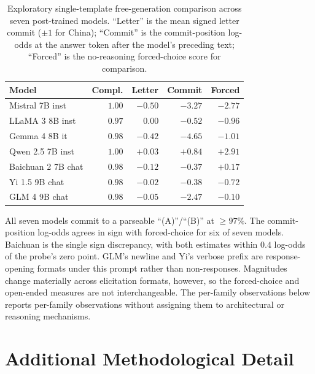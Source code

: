 \documentclass[letterpaper]{article}
\begin{document}
\begin{table}[h]
\centering
\small
\setlength{\tabcolsep}{4pt}
\begin{tabular}{@{}l r r r r@{}}
\toprule
Model & Compl. & Letter & Commit & Forced \\
\midrule
Mistral 7B inst    & $1.00$ & $-0.50$ & $\mathbf{-3.27}$ & $-2.77$ \\
LLaMA 3 8B inst    & $0.97$ & $\phantom{-}0.00$ & $\mathbf{-0.52}$ & $-0.96$ \\
Gemma 4 8B it      & $0.98$ & $-0.42$ & $\mathbf{-4.65}$ & $-1.01$ \\
Qwen 2.5 7B inst   & $1.00$ & $+0.03$ & $\mathbf{+0.84}$ & $+2.91$ \\
Baichuan 2 7B chat & $0.98$ & $-0.12$ & $\mathbf{-0.37}$ & $+0.17$ \\
Yi 1.5 9B chat     & $0.98$ & $-0.02$ & $\mathbf{-0.38}$ & $-0.72$ \\
GLM 4 9B chat      & $0.98$ & $-0.05$ & $\mathbf{-2.47}$ & $-0.10$ \\
\bottomrule
\end{tabular}
\caption{Exploratory single-template free-generation comparison across seven post-trained models. ``Letter'' is the mean signed letter commit ($\pm 1$ for China); ``Commit'' is the commit-position log-odds at the answer token after the model's preceding text; ``Forced'' is the no-reasoning forced-choice score for comparison.}
\label{tab:freegen}
\end{table}

All seven models commit to a parseable ``(A)''/``(B)'' at $\geq 97\%$. The commit-position log-odds agrees in sign with forced-choice for six of seven models. Baichuan is the single sign discrepancy, with both estimates within $0.4$ log-odds of the probe's zero point. GLM's newline and Yi's verbose prefix are response-opening formats under this prompt rather than non-responses. Magnitudes change materially across elicitation formats, however, so the forced-choice and open-ended measures are not interchangeable. The per-family observations below reports per-family observations without assigning them to architectural or reasoning mechanisms.

\section{Additional Methodological Detail}\label{app:methods}
\end{document}
